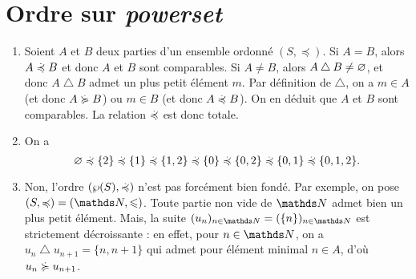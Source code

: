 \section{Ordre sur \textit{powerset}}

\def\preceqd{\mathrel{\overset{\dot{}}{\smash{\preceq}}}}
\def\succeqd{\mathrel{\overset{\dot{}}{\smash{\succeq}}}}

\begin{enumerate}
	\item Soient $A$\/ et $B$\/ deux parties d'un ensemble ordonné $(S, \preceq)$.
		Si $A = B$, alors $A \preceqd B$\/ et donc $A$\/ et $B$\/ sont comparables.
		Si $A \neq B$, alors $A \mathbin{\triangle} B \neq \varnothing$, et donc $A \mathbin{\triangle} B$\/ admet un plus petit élément $m$. Par définition de $\triangle$, on a $m \in A$\/ (et donc $A \succeqd B$) ou $m \in B$\/ (et donc $A \preceqd B$). On en déduit que $A$\/ et $B$\/ sont comparables.
		La relation $\preceqd$\/ est donc totale.

	\item On a \[
			\O \preceqd \{2\} \preceqd \{1\} \preceqd \{1,2\} \preceqd \{0\} \preceqd \{0,2\} \preceqd \{0,1\} \preceqd \{0,1,2\}
		.\]
	\item Non, l'ordre $(\wp(S), \preceqd)$\/ n'est pas forcément bien fondé. Par exemple, on pose $(S,\preceq) = (\N,{\le})$. Toute partie non vide de $\N$\/ admet bien un plus petit élément. Mais, la suite $(u_n)_{n\in\N} = (\{n\})_{n\in\N}$\/ est strictement décroissante : en effet, pour $n \in \N$, on a $u_n \mathbin{\triangle} u_{n+1} = \{n,n+1\}$\/ qui admet pour élément minimal $n \in A$, d'où $u_n \succeqd u_{n+1}$.
\end{enumerate}

